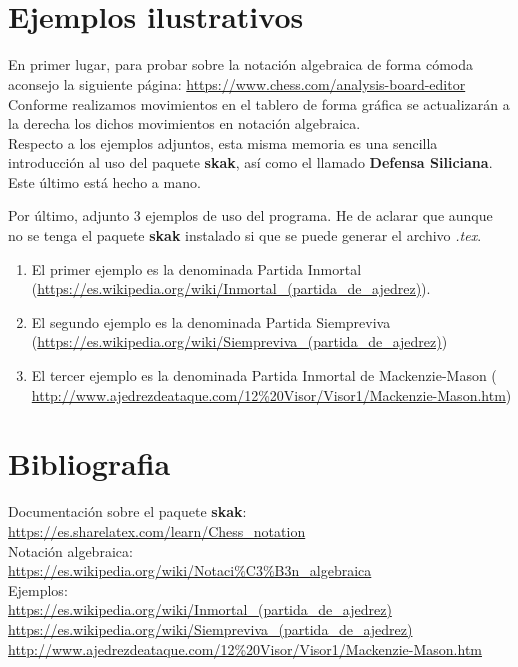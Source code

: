 \documentclass{article}
\begin{document}
 \\
\showboard

 \\
\showboard

\section{Ejemplos ilustrativos}

En primer lugar, para probar sobre la notación algebraica de forma cómoda aconsejo la siguiente página: \url{https://www.chess.com/analysis-board-editor} \\ Conforme realizamos movimientos en el tablero de forma gráfica se actualizarán a la derecha los dichos movimientos en notación algebraica. \\

Respecto a los ejemplos adjuntos, esta misma memoria es una sencilla introducción al uso del paquete \textbf{skak}, así como el llamado \textbf{Defensa Siliciana}. Este último está hecho a mano.

Por último, adjunto 3 ejemplos de uso del programa. He de aclarar que aunque no se tenga el paquete \textbf{skak} instalado si que se puede generar el archivo \emph{.tex}. 

\begin{enumerate}
	\item El primer ejemplo es la denominada Partida Inmortal (\url{https://es.wikipedia.org/wiki/Inmortal_(partida_de_ajedrez)}).
	
	\item El segundo ejemplo es la denominada Partida Siempreviva (\url{https://es.wikipedia.org/wiki/Siempreviva_(partida_de_ajedrez)})
	
	\item El tercer ejemplo es la denominada Partida Inmortal de Mackenzie-Mason ( \url{http://www.ajedrezdeataque.com/12%20Visor/Visor1/Mackenzie-Mason.htm})
\end{enumerate}


\section{Bibliografia}

Documentación sobre el paquete \textbf{skak}: \\
\url{https://es.sharelatex.com/learn/Chess_notation} \\

Notación algebraica: \\
\url{https://es.wikipedia.org/wiki/Notaci%C3%B3n_algebraica} \\

Ejemplos: \\
\url{https://es.wikipedia.org/wiki/Inmortal_(partida_de_ajedrez)} \\
\url{https://es.wikipedia.org/wiki/Siempreviva_(partida_de_ajedrez)} \\
\url{http://www.ajedrezdeataque.com/12%20Visor/Visor1/Mackenzie-Mason.htm} \\
\end{document}
